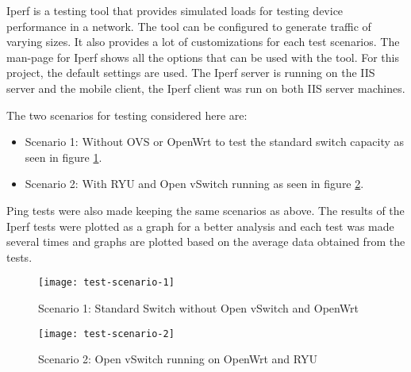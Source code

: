 Iperf is a testing tool that provides simulated loads for testing device performance in a network. The tool can be configured to generate traffic of varying sizes. It also provides a lot of customizations for each test scenarios. The man-page for Iperf shows all the options that can be used with the tool. For this project, the default settings are used. The Iperf server is running on the IIS server and the mobile client, the Iperf client was run on both IIS server machines.

The two scenarios for testing considered here are:
\begin{itemize}
	\item Scenario 1: Without OVS or OpenWrt to test the standard switch capacity as seen in figure \ref{fig:test_scenario_1}. 
	\item Scenario 2: With RYU and Open vSwitch running as seen in figure \ref{fig:test_scenario_2}.
\end{itemize}

Ping tests were also made keeping the same scenarios as above. The results of the Iperf tests were plotted as a graph for a better analysis and each test was made several times and graphs are plotted based on the average data obtained from the tests.

 \begin{figure}
	\centering
	\texttt{[image: test-scenario-1]}
	\caption {Scenario 1: Standard Switch without Open vSwitch and OpenWrt}
	\label{fig:test_scenario_1}
	\vspace{-10pt}
\end{figure}
\begin{figure}
	\centering
	\texttt{[image: test-scenario-2]}
	\caption {Scenario 2: Open vSwitch running on OpenWrt and RYU}
	\label{fig:test_scenario_2}
	\vspace{-10pt}
\end{figure}
%	
